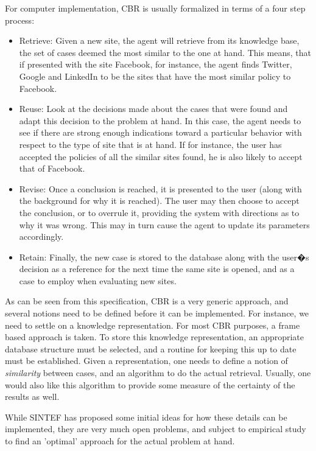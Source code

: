 For computer implementation, CBR is usually formalized in terms of a four step process:

\begin{itemize}
\item Retrieve: 
Given a new site, the agent will retrieve from its knowledge base, the set of cases deemed the most similar to the one at hand. This means, that if presented with the site Facebook, for instance, the agent finds Twitter, Google and LinkedIn to be the sites that have the most similar policy to Facebook.
\item Reuse: 
Look at the decisions made about the cases that were found and adapt this decision to the problem at hand. In this case, the agent needs to see if there are strong enough indications toward a particular behavior with respect to the type of site that is at hand. If for instance, the user has accepted the policies of all the similar sites found, he is also likely to accept that of Facebook.
\item Revise: 
Once a conclusion is reached, it is presented to the user (along with the background for why it is reached). The user may then choose to accept the conclusion, or to overrule it, providing the system with directions as to why it was wrong. This may in turn cause the agent to update its parameters accordingly. 
\item Retain: Finally, the new case is stored to the database along with the user�s decision as a reference for the next time the same site is opened, and as a case to employ when evaluating new sites.
\end{itemize}

As can be seen from this specification, CBR is a very generic approach, and several notions need to be defined before it can be implemented. For instance, we need to settle on a knowledge representation. For most CBR purposes, a frame based approach is taken. To store this knowledge representation, an appropriate database structure must be selected, and a routine for keeping this up to date must be established. Given a representation, one needs to define a notion of \emph{similarity} between cases, and an algorithm to do the actual retrieval. Usually, one would also like this algorithm to provide some measure of the certainty of the results as well.

While SINTEF has proposed some initial ideas for how these details can be implemented, they are very much open problems, and subject to empirical study to find an 'optimal' approach for the actual problem at hand.

